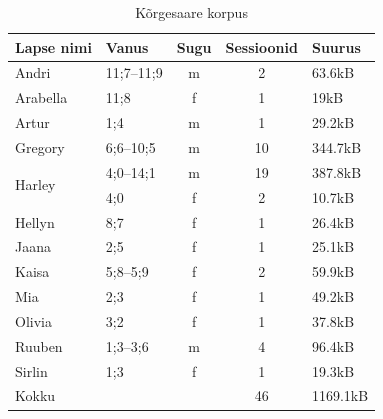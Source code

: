 \documentclass[12pt]{article}
\begin{document}
\begin{table}[H]
\centering
\caption{Kõrgesaare korpus}
\begin{tabular}{|l|l|c|c|l|}
\hline
Lapse nimi              & Vanus      & \multicolumn{1}{l|}{Sugu} & \multicolumn{1}{l|}{Sessioonid} & Suurus \\ \hline\hline
Andri                   & 11;7--11;9 & m                         & 2                               & 63.6kB   \\ \hline
Arabella                & 11;8       & f                         & 1                               & 19kB     \\ \hline
Artur                   & 1;4        & m                         & 1                               & 29.2kB   \\ \hline
Gregory                 & 6;6--10;5  & m                         & 10                              & 344.7kB  \\ \hline
\multirow{2}{*}{Harley} & 4;0--14;1  & m                         & 19                              & 387.8kB  \\ \cline{2-5} 
                        & 4;0        & f                         & 2                               & 10.7kB   \\ \hline
Hellyn                  & 8;7        & f                         & 1                               & 26.4kB   \\ \hline
Jaana                   & 2;5        & f                         & 1                               & 25.1kB   \\ \hline
Kaisa                   & 5;8--5;9   & f                         & 2                               & 59.9kB   \\ \hline
Mia                     & 2;3        & f                         & 1                               & 49.2kB   \\ \hline
Olivia                  & 3;2        & f                         & 1                               & 37.8kB   \\ \hline
Ruuben                  & 1;3--3;6   & m                         & 4                               & 96.4kB   \\ \hline
Sirlin                  & 1;3        & f                         & 1                               & 19.3kB   \\ \hline
Kokku                   & \multicolumn{2}{l|}{}                  & 46                              & 1169.1kB \\ \hline
\end{tabular}
\end{table}
\hfill
\end{document}

